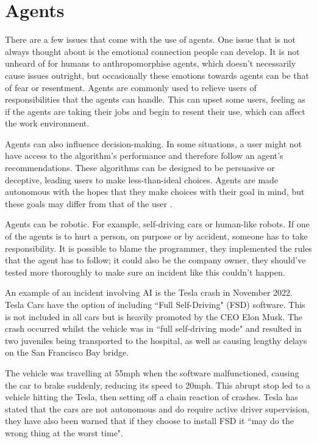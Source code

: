 \documentclass[]{final_report}
\begin{document}
\section{Agents}

There are a few issues that come with the use of agents. One issue that is not always thought about is the emotional connection people can develop. It is not unheard of for humans to anthropomorphise agents, which doesn't necessarily cause issues outright, but occasionally these emotions towards agents can be that of fear or resentment. Agents are commonly used to relieve users of responsibilities that the agents can handle. This can upset some users, feeling as if the agents are taking their jobs and begin to resent their use, which can affect the work environment.

Agents can also influence decision-making. In some situations, a user might not have access to the algorithm's performance and therefore follow an agent's recommendations. These algorithms can be designed to be persuasive or deceptive, leading users to make less-than-ideal choices. Agents are made autonomous with the hopes that they make choices with their goal in mind, but these goals may differ from that of the user \cite{seeber2020collaborating}.

Agents can be robotic. For example, self-driving cars or human-like robots. If one of the agents is to hurt a person, on purpose or by accident, someone has to take responsibility.  It is possible to blame the programmer, they implemented the rules that the agent has to follow; it could also be the company owner, they should've tested more thoroughly to make sure an incident like this couldn't happen.

An example of an incident involving AI is the Tesla crash in November 2022. Tesla Cars have the option of including  ``Full Self-Driving" (FSD) software. This is not included in all cars but is heavily promoted by the CEO Elon Musk. The crash occurred whilst the vehicle was in ``full self-driving mode" and resulted in two juveniles being transported to the hospital, as well as causing lengthy delays on the San Francisco Bay bridge\cite{Tesla}.

The vehicle was travelling at 55mph when the software malfunctioned, causing the car to brake suddenly, reducing its speed to 20mph. This abrupt stop led to a vehicle hitting the Tesla, then setting off a chain reaction of crashes. Tesla has stated that the cars are not autonomous and do require active driver supervision, they have also been warned that if they choose to install FSD it ``may do the wrong thing at the worst time".
\end{document}
